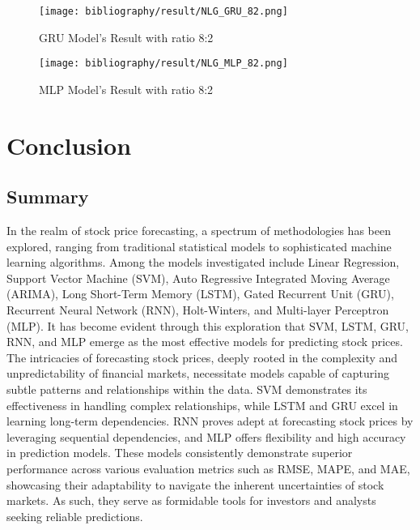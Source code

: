 \documentclass{ieeeojies}
\begin{document}
	\vspace{\baselineskip}
	\begin{figure}[H]
		\centering
		\begin{minipage}{0.9\linewidth}
			\centering
			\texttt{[image: bibliography/result/NLG\_GRU\_82.png]}
			\caption{GRU Model's Result with ratio 8:2}
			\label{fig3.7}
		\end{minipage}
	\end{figure}
	\vspace{\baselineskip}

	\begin{figure}[H]
		\centering
		\begin{minipage}{0.9\linewidth}
			\centering
			\texttt{[image: bibliography/result/NLG\_MLP\_82.png]}
			\caption{MLP Model's Result with ratio 8:2}
			\label{fig3.8}
		\end{minipage}
	\end{figure}
	\vspace{\baselineskip}
	\vspace{\baselineskip}
	\section{Conclusion}
	\subsection{Summary} 
	
	In the realm of stock price forecasting, a spectrum of methodologies has been explored, ranging from traditional statistical models to sophisticated machine learning algorithms. Among the models investigated include Linear Regression, Support Vector Machine (SVM), Auto Regressive Integrated Moving Average (ARIMA), Long Short-Term Memory (LSTM), Gated Recurrent Unit (GRU), Recurrent Neural Network (RNN), Holt-Winters, and Multi-layer Perceptron (MLP). It has become evident through this exploration that SVM, LSTM, GRU, RNN, and MLP emerge as the most effective models for predicting stock prices. \\
	The intricacies of forecasting stock prices, deeply rooted in the complexity and unpredictability of financial markets, necessitate models capable of capturing subtle patterns and relationships within the data. SVM demonstrates its effectiveness in handling complex relationships, while LSTM and GRU excel in learning long-term dependencies. RNN proves adept at forecasting stock prices by leveraging sequential dependencies, and MLP offers flexibility and high accuracy in prediction models. These models consistently demonstrate superior performance across various evaluation metrics such as RMSE, MAPE, and MAE, showcasing their adaptability to navigate the inherent uncertainties of stock markets. As such, they serve as formidable tools for investors and analysts seeking reliable predictions. 
\end{document}
